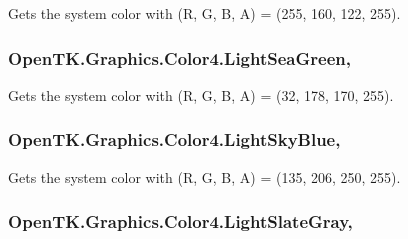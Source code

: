 Gets the system color with (R, G, B, A) = (255, 160, 122, 255). 

\hypertarget{struct_open_t_k_1_1_graphics_1_1_color4_a658732da3f382d4d12b82b88a3e5a67b}{
\subsubsection[{Light\-Sea\-Green}]{ Open\-T\-K.\-Graphics.\-Color4.\-Light\-Sea\-Green\hspace{0.3cm}{\ttfamily [static]}, {\ttfamily [get]}}}\label{struct_open_t_k_1_1_graphics_1_1_color4_a658732da3f382d4d12b82b88a3e5a67b}


Gets the system color with (R, G, B, A) = (32, 178, 170, 255). 

\hypertarget{struct_open_t_k_1_1_graphics_1_1_color4_a0d24ea7e63f0cfecf17110f99d7e852a}{
\subsubsection[{Light\-Sky\-Blue}]{ Open\-T\-K.\-Graphics.\-Color4.\-Light\-Sky\-Blue\hspace{0.3cm}{\ttfamily [static]}, {\ttfamily [get]}}}\label{struct_open_t_k_1_1_graphics_1_1_color4_a0d24ea7e63f0cfecf17110f99d7e852a}


Gets the system color with (R, G, B, A) = (135, 206, 250, 255). 

\hypertarget{struct_open_t_k_1_1_graphics_1_1_color4_ac7b3d7238740f59af4d7d2d45ae13517}{
\subsubsection[{Light\-Slate\-Gray}]{ Open\-T\-K.\-Graphics.\-Color4.\-Light\-Slate\-Gray\hspace{0.3cm}{\ttfamily [static]}, {\ttfamily [get]}}}\label{struct_open_t_k_1_1_graphics_1_1_color4_ac7b3d7238740f59af4d7d2d45ae13517}


